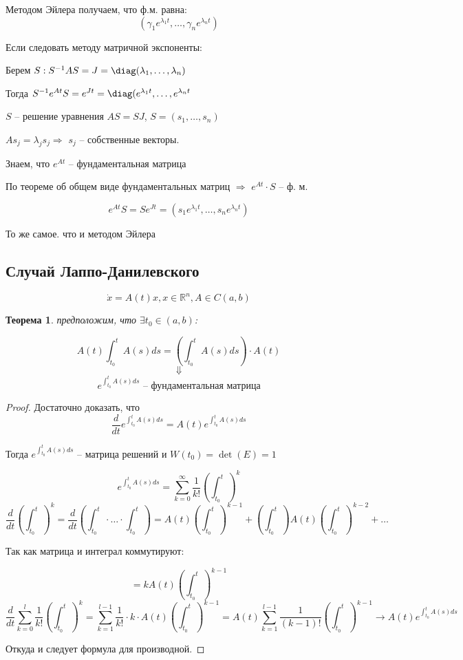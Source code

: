 \documentclass[a4paper]{article}
\theoremstyle{indented}
\newtheorem*{theorem}{Теорема}
\theoremstyle{definition}
\theoremstyle{remark}
\begin{document}
Методом Эйлера получаем, что ф.м. равна:
\[(\gamma_1 e^{\lambda_1 t}, \ldots, \gamma_n e^{\lambda_n t})\]

Если следовать методу матричной экспоненты:

Берем $S : S^{-1}AS = J = \diag (\lambda_1, \ldots, \lambda_n)$

Тогда $S^{-1}e^{At}S = e^{Jt} = \diag (e^{\lambda_1 t}, \ldots, e^{\lambda_n t}$

$S$ -- решение уравнения $AS = SJ$, $S = (s_1, \ldots, s_n)$

$As_j = \lambda_j s_j \Rightarrow $ $s_j$ -- собственные векторы.

Знаем, что $e^{At}$ -- фундаментальная матрица

По теореме об общем виде фундаментальных матриц $\Rightarrow $ $e^{At} \cdot S$ -- ф. м.

\[e^{At} S = S e^{J t} = (s_1 e^{\lambda_1 t}, \ldots, s_n e^{\lambda_n t})\]

То же самое. что и методом Эйлера


\subsection{Случай Лаппо-Данилевского}

\[\dot x = A(t) x, x \in \mathbb{R}^n, A \in C(a,b)\]

\begin{theorem}
  предположим, что $\exists t_0 \in (a,b)$:

  \[A(t) \int_{t_0}^{t}A(s)ds = \left( \int_{t_0}^{t}A(s)ds\right) \cdot A(t) \]
  \[\Downarrow \]
  \[e^{\int_{t_0}^{t}A(s)ds} \text{ -- фундаментальная матрица}\]
  
\end{theorem}

\begin{proof}
  Достаточно доказать, что
  \[\frac{d}{dt}e^{\int_{t_0}^{t}A(s)ds} = A(t) e^{\int_{t_0}^{t}A(s)ds}\]

  Тогда $e^{\int_{t_0}^{t}A(s)ds}$ -- матрица решений и $W(t_0) = \det (E) = 1$

  \[e^{\int_{t_0}^{t}A(s)ds} = \sum_{k = 0}^{\infty} \frac{1}{k!}\left(\int_{t_0}^{t}\right)^k\]
  \[\frac{d}{dt}\left(\int_{t_0}^{t}\right)^k = \frac{d}{dt}\left(\int_{t_0}^{t} \cdot \ldots \cdot \int_{t_0}^{t}\right) = A(t) \left(\int_{t_0}^{t}\right)^{k-1} +\left(\int_{t_0}^{t}\right)A(t) \left(\int_{t_0}^{t}\right)^{k-2} + \ldots\]
  \begin{center}
    Так как матрица и интеграл коммутируют:
  \end{center}
  \[= k A(t) (\int_{t_0}^{t})^{k-1}\]
  \[\frac{d}{dt}\sum_{k = 0}^{l}\frac{1}{k!}(\int_{t_0}^{t})^k = \sum_{k = 1}^{l - 1}\frac{1}{k!}\cdot k \cdot A(t) (\int_{t_0}^{t})^{k-1} = A(t)\sum_{k = 1 }^{l - 1} \frac{1}{(k-1)!} (\int_{t_0}^{t})^{k-1} \to A(t) e^{\int_{t_0}^{t}A(s)ds} \]

  Откуда и следует формула для производной.
\end{proof}
\end{document}
